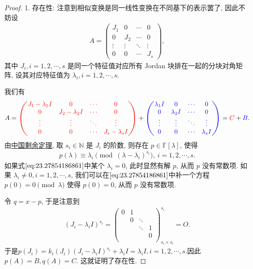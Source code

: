 \documentclass[../../main.tex]{subfiles}
\begin{document}
\begin{proof}
1. {\heiti 存在性:} 注意到相似变换是同一线性变换在不同基下的表示罢了, 因此不妨设
\begin{align}
A = \begin{pmatrix}
J_1 & 0 & \cdots & 0 \\
0 & J_2 & \cdots & 0 \\
\vdots & \vdots & \ddots & \vdots \\
0 & 0 & \cdots & J_s
\end{pmatrix}, \label{eq:23.27854186861--897786123}
\end{align}
其中 \( J_i, i = 1, 2, \cdots, s \) 是同一个特征值对应所有 Jordan 块排在一起的分块对角矩阵, 设其对应特征值为 \( \lambda_i, i = 1, 2, \cdots, s \).

我们有
\[
A = {\color{red} \begin{pmatrix}
J_1 - \lambda_1 I & 0 & \cdots & 0 \\
0 & J_2 - \lambda_2 I & \cdots & 0 \\
\vdots & \vdots & \ddots & \vdots \\
0 & 0 & \cdots & J_s - \lambda_s I
\end{pmatrix}} + {\color{blue} \begin{pmatrix}
\lambda_1 I & 0 & \cdots & 0 \\
0 & \lambda_2 I & \cdots & 0 \\
\vdots & \vdots & \ddots & \vdots \\
0 & 0 & \cdots & \lambda_s I
\end{pmatrix}} = {\color{red} C} + {\color{blue} B}.
\]
由\hyperref[theorem:中国剩余定理(多项式版)]{中国剩余定理}, 取 \( s_i \in \mathbb{N} \) 是 \( J_i \) 的阶数, 则存在 \( p \in \mathbb{F}[\lambda] \), 使得
\begin{align}
p(\lambda) \equiv \lambda_i \pmod{(\lambda - \lambda_i)^{s_i}},\ i = 1, 2, \cdots, s. \label{eq:23.27854186861}
\end{align}
如果式\(\eqref{eq:23.27854186861}\)中某个 \( \lambda_i = 0 \), 此时显然有解 \( p \), 从而 \( p \) 没有常数项. 如果 \( \lambda_i \neq 0, i = 1, 2, \cdots, s \), 我们可以在\(\eqref{eq:23.27854186861}\)中补一个方程 \( p(0) = 0 \pmod{\lambda} \) 使得 \( p(0) = 0 \), 从而 \( p \) 没有常数项.

令 \( q = x - p \), 于是注意到
\begin{align*}
\left( J_i-\lambda _iI \right) ^{s_i}=\left( \begin{matrix}
0&		1&		&		\\
&		0&		\ddots&		\\
&		&		\ddots&		1\\
&		&		&		0\\
\end{matrix} \right) _{s_i\times s_i}^{s_i}=O.
\end{align*}
于是$p(J_i)=k_i\left( J_i \right) \left( J_i-\lambda _iI \right) ^{s_i}+\lambda _iI=\lambda _iI,i=1,2,\cdots ,s.$因此 \( p(A) = B, q(A) = C \). 这就证明了存在性.


\end{proof}
\end{document}

